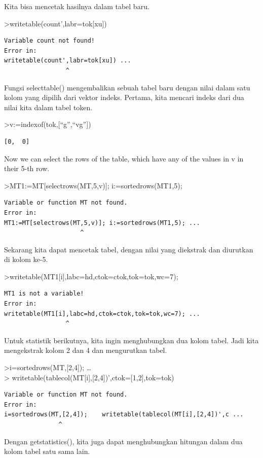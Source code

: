 \documentclass[
]{book}
\begin{document}
Kita bisa mencetak hasilnya dalam tabel baru.

\textgreater writetable(count',labr=tok{[}xu{]})

\begin{verbatim}
Variable count not found!
Error in:
writetable(count',labr=tok[xu]) ...
                 ^
\end{verbatim}

Fungsi selecttable() mengembalikan sebuah tabel baru dengan nilai dalam satu kolom yang dipilih dari vektor indeks. Pertama, kita mencari indeks dari dua nilai kita dalam tabel token.

\textgreater v:=indexof(tok,{[}``g'',``vg''{]})

\begin{verbatim}
[0,  0]
\end{verbatim}

Now we can select the rows of the table, which have any of the values in v in their 5-th row.

\textgreater MT1:=MT{[}selectrows(MT,5,v){]}; i:=sortedrows(MT1,5);

\begin{verbatim}
Variable or function MT not found.
Error in:
MT1:=MT[selectrows(MT,5,v)]; i:=sortedrows(MT1,5); ...
                     ^
\end{verbatim}

Sekarang kita dapat mencetak tabel, dengan nilai yang diekstrak dan diurutkan di kolom ke-5.

\textgreater writetable(MT1{[}i{]},labc=hd,ctok=ctok,tok=tok,wc=7);

\begin{verbatim}
MT1 is not a variable!
Error in:
writetable(MT1[i],labc=hd,ctok=ctok,tok=tok,wc=7); ...
                 ^
\end{verbatim}

Untuk statistik berikutnya, kita ingin menghubungkan dua kolom tabel. Jadi kita mengekstrak kolom 2 dan 4 dan mengurutkan tabel.

\textgreater i=sortedrows(MT,{[}2,4{]}); \ldots{}\\
\textgreater{} writetable(tablecol(MT{[}i{]},{[}2,4{]})',ctok={[}1,2{]},tok=tok)

\begin{verbatim}
Variable or function MT not found.
Error in:
i=sortedrows(MT,[2,4]);    writetable(tablecol(MT[i],[2,4])',c ...
               ^
\end{verbatim}

Dengan getstatistics(), kita juga dapat menghubungkan hitungan dalam dua kolom tabel satu sama lain.
\end{document}
